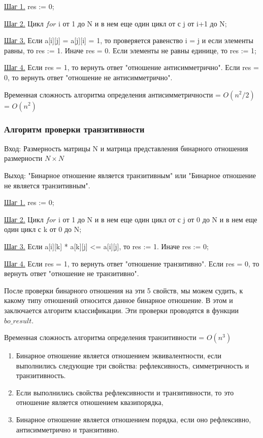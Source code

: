 \documentclass[bachelor, och, labwork]{shiza}
\begin{document}
	\underline{Шаг 1.} res := 0;

	\underline{Шаг 2.} Цикл $for$ i от 1 до N и в нем еще один цикл от с j от i+1 до N;
	
	\underline{Шаг 3.} Если  a[i][j] = a[j][i] = 1, то проверяется равенство i = j и если элементы равны, то res := 1. Иначе res = 0. Если элементы не равны единице, то res := 1;
	
	\underline{Шаг 4.} Если res = 1, то вернуть ответ "отношение антисимметрично". Если res = 0, то вернуть ответ "отношение не антисимметрично".
	
	Временная сложность алгоритма определения антисимметричности = $O(n^2/2)$ = $O(n^2)$
	
	\subsubsection{Алгоритм проверки транзитивности}

	$\textit{Вход:}$ Размерность матрицы N и матрица представления бинарного отношения размерности $N \times N$
	
	$\textit{Выход:}$  "Бинарное отношение является транзитивным" или "Бинарное отношение не является транзитивным".
	
	\underline{Шаг 1.} res := 0;
	
	\underline{Шаг 2.} Цикл $for$ i от 1 до N и в нем еще один цикл от с j от 0 до N и в нем еще один цикл с k от 0 до N;
	
	\underline{Шаг 3.} Если  a[i][k] * a[k][j] <= a[i][j], то res := 1. Иначе res := 0;
	
	\underline{Шаг 4.} Если res = 1, то вернуть ответ "отношение транзитивно". Если res = 0, то вернуть ответ "отношение не транзитивно".
	
	После проверки бинарного отношения на эти 5 свойств, мы можем судить, к какому типу отношений относится данное бинарное отношение. В этом  и заключается алгоритм классификации. Эти проверки проводятся в функции $bo\_result$.
	
	Временная сложность алгоритма определения транзитивности = $O(n^3)$
		
	\begin{enumerate}
		\item Бинарное отношение является отношением эквивалентности, если выполнились следующие три свойства: рефлексивность, симметричность и транзитивность.
		\item Если выполнились свойства рефлексивности и транзитивности, то это отношение является отношением квазипорядка,
		\item Бинарное отношение является отношением порядка, если оно рефлексивно, антисимметрично и транзитивно.
	\end{enumerate}	
\end{document}
